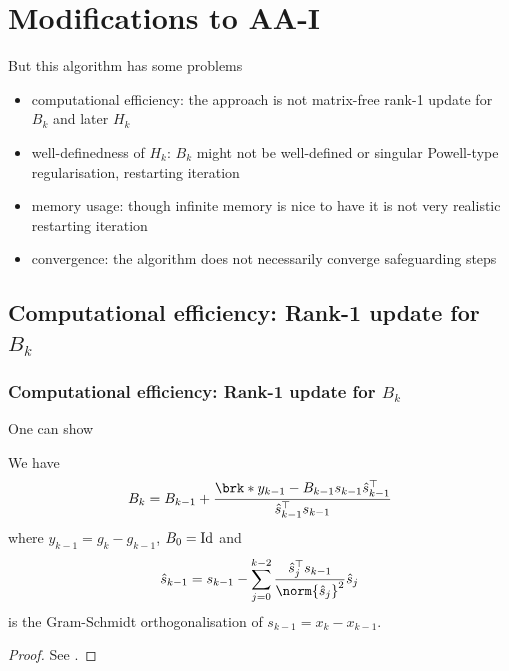 \section{Modifications to AA-I}
\begin{frame}
	But this algorithm has some problems
	\begin{itemize}
		\item computational efficiency: the approach is not matrix-free \textrightarrow rank-1 update for $B_k$ and later $H_k$
		\item well-definedness of $H_k$: $B_k$ might not be well-defined or singular \textrightarrow Powell-type regularisation, restarting iteration
		\item memory usage: though infinite memory is nice to have it is not very realistic \textrightarrow restarting iteration
		\item convergence: the algorithm does not necessarily converge \textrightarrow safeguarding steps
	\end{itemize}
\end{frame}

\subsection{Computational efficiency: Rank-1 update for $B_k$}

\begin{frame}
	\frametitle{Computational efficiency: Rank-1 update for $B_k$}
	One can show
	\begin{proposition}
		We have
		\begin{align*}
			B_{k} = B_{k-1}+\frac{\brk*{y_{k-1}-B_{k-1}s_{k-1}}\hs_{k-1}^\top}{\hs_{k-1}^\top s_{k-1}}
		\end{align*}
		where $y_{k-1} = g_{k}-g_{k-1}$, $B_0=\operatorname{Id}$ and
		\begin{align*}
			\hs_{k-1} = s_{k-1}-\sum_{j=0}^{k-2}\frac{\hs_j^\top s_{k-1}}{\norm{\hs_j}^2}\hs_j
		\end{align*}
		is the Gram-Schmidt orthogonalisation of $s_{k-1}=x_{k}-x_{k-1}$.
	\end{proposition}
	\begin{proof}
		See \cite{ZhaAA}.
	\end{proof}
\end{frame}

